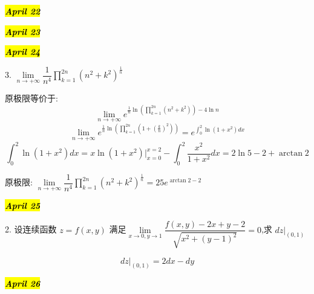\hl{\textbf{\textit{April 22}}}

\hl{\textbf{\textit{April 23}}}

\hl{\textbf{\textit{April 24}}}




3. $\lim\limits_{n\rightarrow +\infty}\dfrac{1}{n^4}\prod\limits_{k=1}^{2n}(n^2+k^2)^{\frac{1}{n}}$
\begin{solution}
	
	原极限等价于: 
	$$\lim\limits_{n\rightarrow +\infty}e^{\frac{1}{n}\ln(\prod\limits_{k=1}^{2n}(n^2+k^2))-4\ln n} $$
	$$\lim\limits_{n\rightarrow +\infty}e^{\frac{1}{n}\ln(\prod\limits_{k=1}^{2n}(1+(\frac{k}{n})^2))}=e^{\int_{0}^{2}\ln(1+x^2)dx}$$
	$$\int_{0}^{2}\ln(1+x^2)dx=x\ln(1+x^2)|_{x=0}^{x=2}-\int_{0}^{2}\dfrac{x^2}{1+x^2}dx=2\ln5 -2+\arctan 2$$
	
	原极限: $\lim\limits_{n\rightarrow
		+\infty}\dfrac{1}{n^4}\prod\limits_{k=1}^{2n}(n^2+k^2)^{\frac{1}{n}}=25e^{\arctan 2-2}$
\end{solution}

\hl{\textbf{\textit{April 25}}}


2. 设连续函数 $z=f(x,y)$ 满足$\lim\limits_{x\rightarrow 0,y\rightarrow 1}\dfrac{f(x,y)-2x+y-2}{\sqrt{x^2+(y-1)^2}}=0$,求 $dz|_{(0,1)}$
\begin{solution}
	
	$$dz|_{(0,1)}=2dx-dy$$
\end{solution}


\hl{\textbf{\textit{April 26}}}

